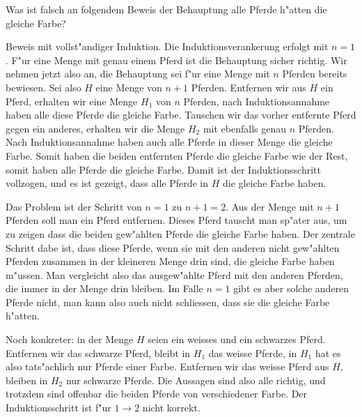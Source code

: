 Was ist falsch an folgendem Beweis der Behauptung alle Pferde h"atten die
gleiche Farbe?

Beweis mit vollst"andiger Induktion. Die Induktionsverankerung
erfolgt mit $n=1$. F"ur eine Menge mit genau einem Pferd ist
die Behauptung sicher richtig. Wir nehmen jetzt also an, die
Behauptung sei f"ur eine Menge mit $n$ Pferden bereits bewiesen.
Sei also $H$ eine Menge von $n+1$ Pferden. Entfernen wir aus $H$
ein Pferd, erhalten wir eine Menge $H_1$ von $n$ Pferden, nach
Induktionsannahme haben alle diese Pferde die gleiche Farbe.
Tauschen wir das vorher entfernte Pferd gegen ein anderes, erhalten
wir die Menge $H_2$ mit ebenfalls genau $n$ Pferden. Nach Induktionsannahme
haben auch alle Pferde in dieser Menge die gleiche Farbe. Somit
haben die beiden entfernten Pferde die gleiche Farbe wie der Rest,
somit haben alle Pferde die gleiche Farbe. Damit ist der Induktionsschritt
vollzogen, und es ist gezeigt, dass alle Pferde in $H$ die gleiche Farbe
haben.

\begin{loesung}
Das Problem ist der Schritt von $n=1$ zu $n+1=2$.
Aus der Menge mit $n+1$ Pferden soll man ein Pferd entfernen.
Dieses Pferd tauscht man sp"ater aus, um zu zeigen dass die
beiden gew"ahlten Pferde die gleiche Farbe haben. Der zentrale
Schritt dabe ist, dass diese Pferde, wenn sie mit den anderen nicht
gew"ahlten Pferden zusammen in der kleineren Menge drin sind,
die gleiche Farbe haben m"ussen. Man vergleicht also das ausgew"ahlte
Pferd mit den anderen Pferden, die immer in der Menge drin bleiben.
Im Falle $n=1$ gibt es aber solche
anderen Pferde nicht, man kann also auch nicht schliessen, dass
sie die gleiche Farbe h"atten.

Noch konkreter: in der Menge $H$ seien ein weisses und ein schwarzes Pferd.
Entfernen wir das schwarze Pferd, bleibt in $H_1$ das weisse Pferde,
in $H_1$ hat es also tats"achlich nur Pferde einer Farbe. Entfernen
wir das weisse Pferd aus $H$, bleiben in $H_2$ nur schwarze
Pferde. Die Aussagen sind also alle richtig, und trotzdem sind
offenbar die beiden Pferde von verschiedener Farbe. Der Induktionsschritt
ist f"ur $1\to 2$ nicht korrekt.
\end{loesung}
